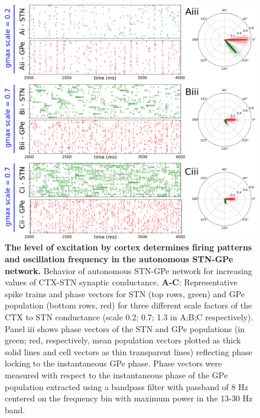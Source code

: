 \begin{figure}
\centering
\includegraphics[width=\textwidth]{ch_detailed_model/figs_split/fig_endogenous_sweep-gmax-ctx-stn_B-rasters-vectors.png}
%
\caption{\textbf{The level of excitation by cortex determines firing patterns and oscillation frequency in the autonomous STN-GPe network.}
Behavior of autonomous STN-GPe network for increasing values of CTX-STN synaptic conductance.
\textbf{A-C}: Representative spike trains and phase vectors for STN (top rows, green) and GPe population (bottom rows, red) for three different scale factors of the CTX to STN conductance (scale 0.2; 0.7; 1.3 in A;B;C respectively). Panel iii shows phase vectors of the STN and GPe populations (in green; red, respectively, mean population vectors plotted as thick solid lines and cell vectors as thin transparent lines) reflecting phase locking to the instantaneous GPe phase. Phase vectors were measured with respect to the instantaneous phase of the GPe population extracted using a bandpass filter with passband of 8 Hz centered on the frequency bin with maximum power in the 13-30 Hz band.
}
\label{fig:endogenous_sweep-gmax-ctx-stn_B-rasters-vectors}
\end{figure}

%
%
%
%
%
%

